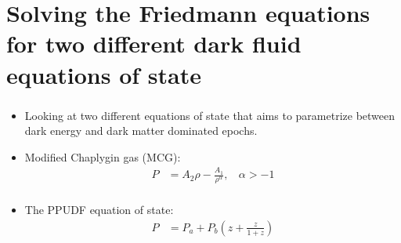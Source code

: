 \documentclass[8pt,hideothersubsections]{beamer}
\newcommand{\brac}[1]{\left(#1\right)}
\begin{document}
\section{Solving the Friedmann equations for two different dark fluid equations of state}
\begin{frame}
\frametitle{\insertsectionhead}
\begin{itemize}
\item Looking at two different equations of state that aims to parametrize between dark energy and dark matter dominated epochs.\\
\vspace{15pt}
\item Modified Chaplygin gas (MCG):
\begin{equation}\label{eq:MCG}
\begin{split}
P &=A_{2}\rho -\frac{A_{1}}{\rho^{\alpha}},\ \ \ \ \alpha>-1        \\
\end{split}
\end{equation}
\item The PPUDF equation of state:
\begin{equation}\label{eq:UDFEoS}
\begin{split}
P &= P_{a}+P_{b}\brac{z+\frac{z}{1+z}}         \\
\end{split}
\end{equation}
\end{itemize}
\end{frame}
%
%
%
%
%
%
%
\end{document}
